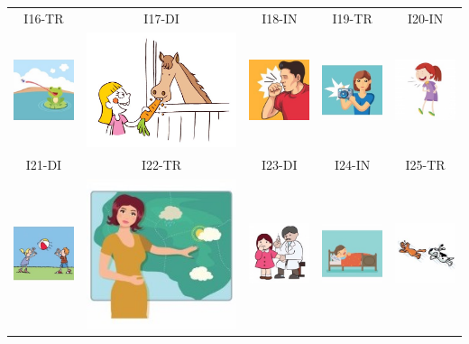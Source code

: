 \documentclass[12pt,notitlepage]{article}
\begin{document}
\begin{center}
\begin{tabular}{|c||c||c||c||c|}
\hline
\hline
I16-TR & I17-DI & I18-IN & I19-TR & I20-IN \\
\includegraphics[width=0.13\columnwidth]{square/I16.jpg} & \includegraphics[width=0.13\columnwidth]{figures/I17.jpg} &  \includegraphics[width=0.13\columnwidth]{square/I18.jpg} &  \includegraphics[width=0.13\columnwidth]{square/I19.jpg} & \includegraphics[width=0.13\columnwidth]{square/I20.jpg} \\
\hline
\hline
I21-DI & I22-TR & I23-DI & I24-IN & I25-TR \\
\includegraphics[width=0.13\columnwidth]{square/I21.jpg} &  \includegraphics[width=0.13\columnwidth]{square/I22.jpg} &  \includegraphics[width=0.13\columnwidth]{square/I23.jpg} & \includegraphics[width=0.13\columnwidth]{square/I24.jpg} & \includegraphics[width=0.13\columnwidth]{square/I25.jpg} \\

\end{tabular}
\end{center}
\end{document}
